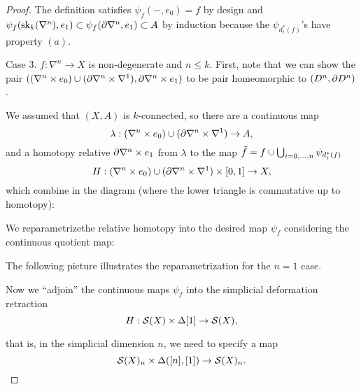 \begin{proof}
The definition satisfies $\psi_f(-,e_0)=f$ by design and $\psi_f(\sk_k(\nabla^n),e_1)\subset\psi_f(\de\nabla^n,e_1)\subset A$ by induction because the $\psi_{d_i^*(f)}$'s have property $(a)$.

Case 3. $f:\nabla^n\to X$ is non-degenerate and $n\leq k$. First, note that we can show the pair $((\nabla^n\times e_0)\cup(\de\nabla^n\times\nabla^1), \de\nabla^n\times e_1)$ to be pair homeomorphic to $(D^n,\de D^n)$.

We assumed that $(X,A)$ is $k$-connected, so there are a continuous map
\[\lambda:(\nabla^n\times e_0)\cup(\de\nabla^n\times\nabla^1)\to A,\]
and a homotopy relative $\de\nabla^n\times e_1$ from $\lambda$ to the map $\til f=f\cup\bigcup_{i=0,\dots,n} \psi_{d_i^*(f)}$
\[H:(\nabla^n\times e_0)\cup(\de\nabla^n\times\nabla^1)\times[0,1]\to X,\]
which combine in the diagram (where the lower triangle is commutative up to homotopy):
\begin{center}
\end{center}

We reparametrizethe relative homotopy into the desired map $\psi_f$ considering the continuous quotient map:
\begin{center}
\end{center}

\smallskip

\bigskip

The following picture illustrates the reparametrization for the $n=1$ case.

\smallskip

\bigskip

Now we \enquote{adjoin} the continuous maps $\psi_f$ into the simplicial deformation retraction
\[H:\S(X)\times\Delta[1]\to \S(X),\]

that is, in the simplicial dimension $n$, we need to specify a map
\[\S(X)_n\times\Delta([n],[1])\to \S(X)_n.\]


\end{proof}
